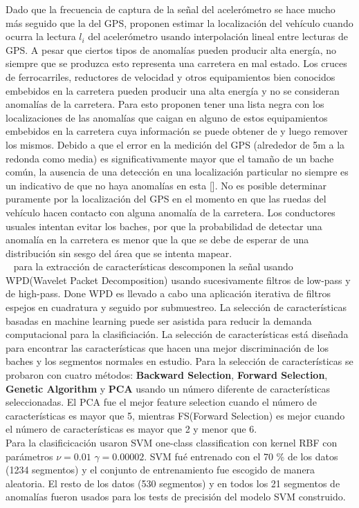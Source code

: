 Dado que la frecuencia de captura de la señal del acelerómetro se hace mucho más seguido que la del GPS, proponen estimar la localización del vehículo
cuando ocurra la lectura $l_i$ del acelerómetro usando interpolación lineal entre lecturas de GPS. A pesar que ciertos tipos de anomalías pueden producir
alta energía, no siempre que se produzca esto representa una carretera en mal estado. Los cruces de ferrocarriles, reductores de velocidad y otros
equipamientos bien conocidos embebidos en la carretera pueden producir una alta energía y no se consideran anomalías de la carretera. Para esto proponen
tener una lista negra con los localizaciones de las anomalías que caigan en alguno de estos equipamientos embebidos en la carretera cuya información se
puede obtener de y luego remover los mismos. Debido a que el error en la medición del GPS (alrededor de 5m a la redonda como media) es significativamente
mayor que el tamaño de un bache común, la ausencia de una detección en una localización particular no siempre es un indicativo de que no haya anomalías en
esta []. No es posible determinar puramente por la localización del GPS en el momento en que las ruedas del vehículo hacen contacto con alguna anomalía de
la carretera. Los conductores usuales intentan evitar los baches, por que la probabilidad de detectar una anomalía en la carretera es menor que la que se
debe de esperar de una distribución sin sesgo del área que se intenta mapear.\\

~\cite{cong2013applying} para la extracción de características descomponen la señal usando WPD(Wavelet Packet Decomposition) usando sucesivamente filtros de low-pass y de high-pass.
Done WPD es llevado a cabo una aplicación iterativa de filtros espejos en cuadratura y seguido por submuestreo. La selección de características basadas
en machine learning puede ser asistida para reducir la demanda computacional para la clasificiación. La selección de características está diseñada para
encontrar las características que hacen una mejor discriminación de los baches y los segmentos normales en estudio.
Para la selección de características se probaron con cuatro métodos: \textbf{Backward Selection}, \textbf{Forward Selection}, \textbf{Genetic Algorithm} y
\textbf{PCA} usando un número diferente de características seleccionadas. El PCA fue el mejor feature selection cuando el número de características es mayor
que 5, mientras FS(Forward Selection) es mejor cuando el número de características es mayor que 2 y menor que 6.
\\
Para la clasificicación usaron SVM one-class classification con kernel RBF con parámetros  $\nu = 0.01$  $\gamma = 0.00002$. SVM fué entrenado con el 70 \%  de los datos
(1234 segmentos) y el conjunto de entrenamiento fue escogido de manera aleatoria. El resto de los datos  (530 segmentos) y en todos los 21 segmentos de anomalías fueron
usados para los tests de precisión del modelo SVM construido.

